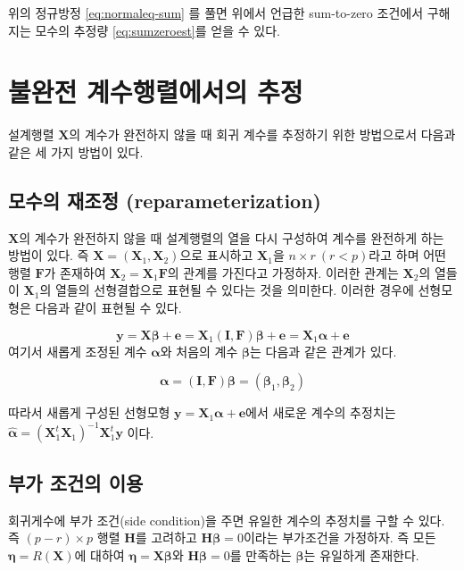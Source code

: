 \documentclass[
  10pt,
]{book}
\theoremstyle{definition}
\theoremstyle{definition}
\theoremstyle{definition}
\theoremstyle{definition}
\theoremstyle{remark}
\begin{document}
위의 정규방정 \eqref{eq:normaleq-sum} 를 풀면 위에서 언급한 sum-to-zero 조건에서 구해지는 모수의 추정량 \eqref{eq:sumzeroest}를 얻을 수 있다.

\hypertarget{uxbd88uxc644uxc804-uxacc4uxc218uxd589uxb82cuxc5d0uxc11cuxc758-uxcd94uxc815}{%
\section{불완전 계수행렬에서의 추정}\label{uxbd88uxc644uxc804-uxacc4uxc218uxd589uxb82cuxc5d0uxc11cuxc758-uxcd94uxc815}}

설계행렬 \(\bm X\)의 계수가 완전하지 않을 때 회귀 계수를 추정하기 위한 방법으로서 다음과 같은 세 가지 방법이 있다.

\hypertarget{uxbaa8uxc218uxc758-uxc7acuxc870uxc815-reparameterization}{%
\subsection{모수의 재조정 (reparameterization)}\label{uxbaa8uxc218uxc758-uxc7acuxc870uxc815-reparameterization}}

\(\bm X\)의 계수가 완전하지 않을 때 설계행렬의 열을 다시 구성하여 계수를 완전하게 하는 방법이 있다. 즉 \(\bm X = (\bm X_1, \bm X_2)\)으로 표시하고 \(\bm X_1\)을 \(n \times r~ (r < p)\)라고 하며 어떤 행렬 \(\bm F\)가 존재하여 \(\bm X_2 = \bm X_1 \bm F\)의 관계를 가진다고 가정하자. 이러한 관계는 \(\bm X_2\)의 열들이 \(\bm X_1\)의 열들의 선형결합으로 표현될 수 있다는 것을 의미한다. 이러한 경우에 선형모형은 다음과 같이 표현될 수 있다.

\[
\bm y= \bm X \bm \beta + \bm e = \bm X_1 (\bm I, \bm F)\bm \beta  + \bm e = \bm X_1 \bm \alpha +\bm e
\]
여기서 새롭게 조정된 계수 \(\bm \alpha\)와 처음의 계수 \(\bm \beta\)는 다음과 같은 관계가 있다.

\[
\bm \alpha =   (\bm I, \bm F)\bm \beta = (\bm \beta_1,  \bm \beta_2)
\]

따라서 새롭게 구성된 선형모형 \(\bm y=\bm X_1 \bm \alpha +\bm e\)에서 새로운 계수의 추정치는 \(\hat {\bm \alpha} = (\bm X_1^t \bm X_1 )^{-1} \bm X_1^t \bm y\) 이다.

\hypertarget{uxbd80uxac00-uxc870uxac74uxc758-uxc774uxc6a9}{%
\subsection{부가 조건의 이용}\label{uxbd80uxac00-uxc870uxac74uxc758-uxc774uxc6a9}}

회귀게수에 부가 조건(side condition)을 주면 유일한 계수의 추정치를 구할 수 있다. 즉 \((p-r) \times p\) 행렬 \(\bm H\)를 고려하고 \(\bm H \bm \beta =0\)이라는 부가조건을 가정하자. 즉 모든 \(\bm \eta = R(\bm X)\)에 대하여 \(\bm \eta=\bm X \bm \beta\)와 \(\bm H \bm \beta =0\)를 만족하는 \(\bm \beta\)는 유일하게 존재한다.
\end{document}
